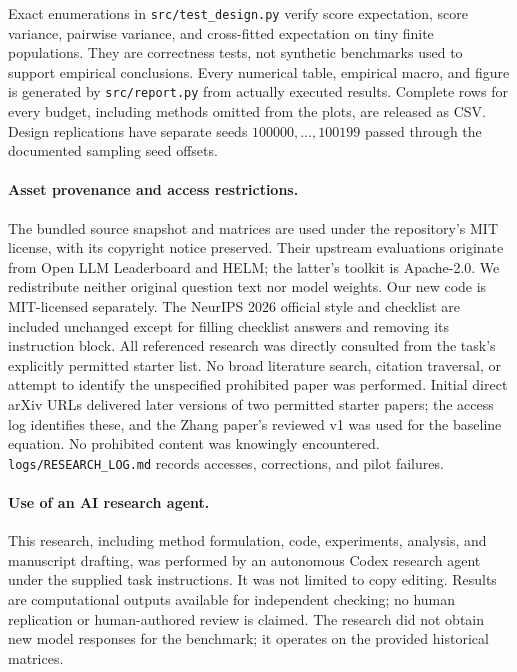 \documentclass{article}
\begin{document}
Exact enumerations in \texttt{src/test\_design.py} verify score expectation, score variance, pairwise variance, and cross-fitted expectation on tiny finite populations. They are correctness tests, not synthetic benchmarks used to support empirical conclusions. Every numerical table, empirical macro, and figure is generated by \texttt{src/report.py} from actually executed results. Complete rows for every budget, including methods omitted from the plots, are released as CSV. Design replications have separate seeds $100000,\ldots,100199$ passed through the documented sampling seed offsets.

\paragraph{Asset provenance and access restrictions.}
The bundled source snapshot and matrices are used under the repository's MIT license, with its copyright notice preserved. Their upstream evaluations originate from Open LLM Leaderboard and HELM; the latter's toolkit is Apache-2.0. We redistribute neither original question text nor model weights. Our new code is MIT-licensed separately. The NeurIPS 2026 official style and checklist are included unchanged except for filling checklist answers and removing its instruction block. All referenced research was directly consulted from the task's explicitly permitted starter list. No broad literature search, citation traversal, or attempt to identify the unspecified prohibited paper was performed. Initial direct arXiv URLs delivered later versions of two permitted starter papers; the access log identifies these, and the Zhang paper's reviewed v1 was used for the baseline equation. No prohibited content was knowingly encountered. \texttt{logs/RESEARCH\_LOG.md} records accesses, corrections, and pilot failures.

\paragraph{Use of an AI research agent.}
This research, including method formulation, code, experiments, analysis, and manuscript drafting, was performed by an autonomous Codex research agent under the supplied task instructions. It was not limited to copy editing. Results are computational outputs available for independent checking; no human replication or human-authored review is claimed. The research did not obtain new model responses for the benchmark; it operates on the provided historical matrices.

\clearpage

\end{document}
